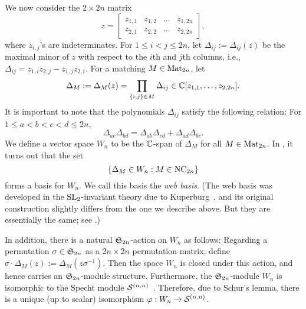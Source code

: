 We now consider the \( 2 \times 2n \) matrix
\[
  z = 
  \begin{bmatrix}
    z_{1,1} & z_{1,2} & \dots & z_{1,2n} \\
    z_{2,1} & z_{2,2} & \dots & z_{2,2n}
  \end{bmatrix},
\]
where \( z_{i,j} \)'s are indeterminates.
For \( 1\le i<j\le 2n \), let \( \Delta_{ij}:=\Delta_{ij}(z) \) be the maximal minor of \( z \) with respect to the \( i \)th and \( j \)th columns,
i.e., \( \Delta_{ij} = z_{1,i} z_{2,j} - z_{1,j} z_{2,i} \).
For a matching \( M\in\operatorname{Mat}_{2n} \), let
\[
  \Delta_M := \Delta_M(z) = \prod_{\{i,j\}\in M} \Delta_{ij} \in \mathbb{C}[z_{1,1},\dots,z_{2,2n}].
\]
It is important to note that the polynomials \( \Delta_{ij} \) satisfy the following relation:
For \( 1\le a<b<c<d \le 2n\),
\begin{equation} \label{eq:syzygy}
  \Delta_{ac} \Delta_{bd}
    = \Delta_{ab} \Delta_{cd} + \Delta_{ad} \Delta_{bc}.
\end{equation}
We define a vector space \( W_n \) to be the \( \mathbb{C} \)-span of \( \Delta_M \)
for all \( M\in\operatorname{Mat}_{2n} \).
In \cite{KR84}, it turns out that the set
\begin{equation} \label{eq:basis_NC}
  \{ \Delta_{M}\in W_n : M\in\operatorname{NC}_{2n} \}
\end{equation}
forms a basis for \( W_n \). We call this basis the \emph{web basis}.
(The web basis was developed in the \( \operatorname{SL}_2 \)-invariant theory
due to Kuperburg~\cite{Kup96},
and its original construction slightly differs from the one we describe above.
But they are essentially the same; see \cite{Rho19}.)

In addition, there is a natural \( \mathfrak{S}_{2n} \)-action on \( W_n \)
as follows: Regarding a permutation \( \sigma\in\mathfrak{S}_{2n} \) as
a \( 2n\times 2n \) permutation matrix, define \( \sigma\cdot \Delta_M(z)
:= \Delta_M(z\sigma^{-1}) \).
Then the space \( W_n \) is closed under this action,
and hence carries an \( \mathfrak{S}_{2n} \)-module structure.
Furthermore, the \( \mathfrak{S}_{2n} \)-module \( W_n \) is isomorphic to
the Specht module \( \mathcal{S}^{(n,n)} \)~\cite{PPR09}.
Therefore, due to Schur's lemma, there is a unique (up to scalar)
isomorphism \( \varphi:W_n \rightarrow \mathcal{S}^{(n,n)} \).

